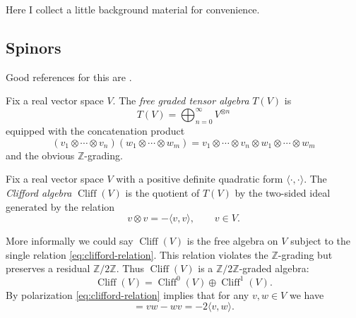 \documentclass[12pt,letterpaper,reqno]{article}
\numberwithin{equation}{section}
\newcommand{\Z}{\ensuremath{\mathbb Z}}
\newcommand{\IP}[1]{\langle#1\rangle}
\newcommand{\ti}[1]{\textit{#1}}
\DeclareMathOperator{\Cliff}{Cliff}
\begin{document}
Here I collect a little background material for convenience.

\subsection{Spinors} \label{app:spinors}

Good references for this are \cite{MR1031992,MR1367507}.

\begin{defn} Fix a real vector space $V$. The
\ti{free graded tensor algebra} $T(V)$ is
\begin{equation}
  T(V) = \bigoplus_{n=0}^\infty V^{\otimes n}
\end{equation}
equipped with the concatenation product
\begin{equation}
  (v_1 \otimes \cdots \otimes v_n) (w_1 \otimes \cdots \otimes w_m) = v_1 \otimes \cdots \otimes v_n \otimes w_1 \otimes \cdots \otimes w_m
\end{equation}
and the obvious $\Z$-grading.
\end{defn}

\begin{defn} Fix a real vector space $V$ with a positive definite
quadratic form $\IP{\cdot,\cdot}$. The \ti{Clifford algebra} $\Cliff(V)$ is the quotient
of $T(V)$ by the two-sided ideal generated by the relation
\begin{equation} \label{eq:clifford-relation}
  v \otimes v = -\IP{v,v}, \qquad v \in V.
\end{equation}
\end{defn}
More informally we could say $\Cliff(V)$ is the free algebra on $V$
subject to the single relation \eqref{eq:clifford-relation}.
This relation violates the $\Z$-grading but preserves a residual $\Z/2\Z$.
Thus $\Cliff(V)$ is a $\Z/2\Z$-graded algebra:
\begin{equation}
  \Cliff(V) = \Cliff^0(V) \oplus \Cliff^1(V).
\end{equation}
By polarization \eqref{eq:clifford-relation} implies that for any $v, w \in V$ we have
\begin{equation}
  [v,w] = v w - w v = -2 \IP{v,w}.
\end{equation}

\end{document}
